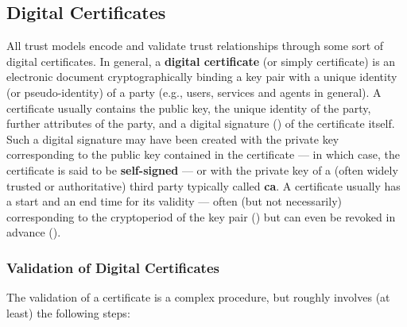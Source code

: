 \subsection{Digital Certificates}\label{sec:binding_keys_to_parties:digital_certificate}

All trust models encode and validate trust relationships through some sort of digital certificates. In general, a \textbf{digital certificate} (or simply certificate) is an electronic document cryptographically binding a key pair with a unique identity (or pseudo-identity) of a party (e.g., users, services and agents in general). A certificate usually contains the public key, the unique identity of the party, further attributes of the party, and a digital signature () of the certificate itself. Such a digital signature may have been created with the private key corresponding to the public key contained in the certificate --- in which case, the certificate is said to be \textbf{self-signed} --- or with the private key of a (often widely trusted or authoritative) third party typically called \textbf{\gls{ca}}. A certificate usually has a start and an end time for its validity --- often (but not necessarily) corresponding to the cryptoperiod of the key pair () but can even be revoked in advance ().


\subsubsection{Validation of Digital Certificates}\label{sec:binding_keys_to_parties:digital_certificate:validation}

The validation of a certificate is a complex procedure, but roughly involves (at least) the following steps:

